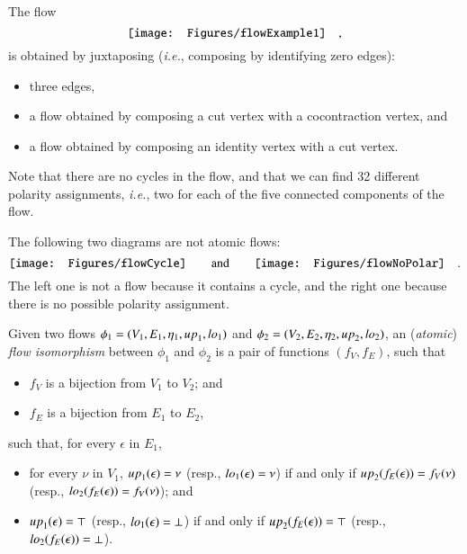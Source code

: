 \begin{example}
The flow
\[
\vcenter{\hbox{\texttt{[image: Figures/flowExample1]}}}\quad,
\]
is obtained by juxtaposing (\emph{i.e.}, composing by identifying zero edges):
\begin{itemize}
\item three edges, 
\item a flow obtained by composing a cut vertex with a cocontraction vertex, and
\item a flow obtained by composing an identity vertex with a cut vertex.
\end{itemize}
Note that there are no cycles in the flow, and that we can find 32 different polarity assignments, \emph{i.e.}, two for each of the five connected components of the flow.
\end{example}

\begin{example}The following two diagrams are not atomic flows:
\[
\vcenter{\hbox{\texttt{[image: Figures/flowCycle]}}}
\qquad\mbox{and}\qquad
\vcenter{\hbox{\texttt{[image: Figures/flowNoPolar]}}}
\quad.
\]
The left one is not a flow because it contains a cycle, and the right one because there is no possible polarity assignment.
\end{example}


\begin{definition}\label{definition:FlowIsomorphism}
Given two flows $\phi_1=(V_1,E_1,\eta_1,{\mathit up}_1,{\mathit lo}_1)$ and $\phi_2=(V_2,E_2,\eta_2,{\mathit up}_2,{\mathit lo}_2)$, an (\emph{atomic}) \emph{flow isomorphism} between $\phi_1$ and $\phi_2$ is a pair of functions $(f_V,f_E)$, such that
\begin{itemize}
\item $f_V$ is a bijection from $V_1$ to $V_2$; and 
\item $f_E$ is a bijection from $E_1$ to $E_2$,
\end{itemize}
such that, for every $\epsilon$ in $E_1$,
\begin{itemize}
\item for every $\nu$ in $V_1$, ${\mathit up}_1(\epsilon)=\nu$ (resp., ${\mathit lo}_1(\epsilon)=\nu$) if and only if ${\mathit up}_2(f_E(\epsilon))=f_V(\nu)$ (resp., ${\mathit lo}_2(f_E(\epsilon))=f_V(\nu)$); and
\item ${\mathit up}_1(\epsilon)=\top$ (resp., ${\mathit lo}_1(\epsilon)=\bot$) if and only if ${\mathit up}_2(f_E(\epsilon))=\top$ (resp., ${\mathit lo}_2(f_E(\epsilon))=\bot$).
\end{itemize}
\end{definition}

